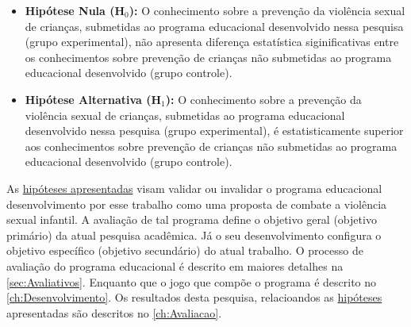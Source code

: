 \label{hipotese}
\begin{itemize}

	\item \textbf{Hipótese Nula (H$_{0}$):} O conhecimento sobre a prevenção da violência sexual de crianças, submetidas ao programa educacional desenvolvido nessa pesquisa (grupo experimental), não apresenta diferença estatística siginificativas entre os conhecimentos sobre prevenção de crianças não submetidas ao programa educacional desenvolvido (grupo controle).
	
	\item \textbf{Hipótese Alternativa (H$_{1}$):} O conhecimento sobre a prevenção da violência sexual de crianças, submetidas ao programa educacional desenvolvido nessa pesquisa (grupo experimental), é estatisticamente superior aos conhecimentos sobre prevenção de crianças não submetidas ao programa educacional desenvolvido (grupo controle). 
\end{itemize}




As \hyperref[hipotese]{hipóteses apresentadas} visam validar ou invalidar o programa educacional desenvolvimento por esse trabalho como uma proposta de combate a violência sexual infantil. A avaliação de tal programa define o objetivo geral (objetivo primário) da atual pesquisa acadêmica. Já o seu desenvolvimento configura o objetivo específico (objetivo secundário) do atual trabalho. O processo de avaliação do programa educacional é descrito em maiores detalhes na \autoref{sec:Avaliativos}. Enquanto que o jogo que compõe o programa é descrito no \autoref{ch:Desenvolvimento}. Os resultados desta pesquisa, relacioandos as \hyperref[hipotese]{hipóteses} apresentadas são descritos no \autoref{ch:Avaliacao}.

